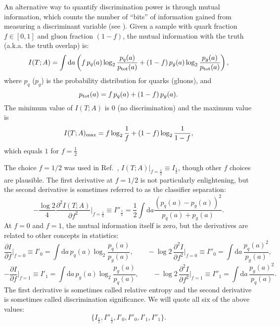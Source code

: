 \documentclass[11pt,letterpaper]{article}
\newcommand{\df}{\text{d}}
\DeclareRobustCommand{\Ref}[1]{Ref.~\cite{#1}}
\newcommand{\be}{\begin{equation}}
\newcommand{\ee}{\end{equation}}
\begin{document}
An alternative way to quantify discrimination power is through mutual information, which counts the number of ``bits'' of information gained from measuring a discriminant variable (see \cite{Larkoski:2014pca}).  Given a sample with quark fraction $f \in [0,1]$ and gluon fraction $(1-f)$, the mutual information with the truth (a.k.a. the truth overlap) is:
\be
I(T;A) = \int \df a \left(f \, p_q(a) \log_2 \frac{p_q(a)}{p_{\rm tot}(a)} + (1-f) \, p_g(a) \log_2 \frac{p_g(a)}{p_{\rm tot}(a)}   \right),
\ee
where $p_q$ ($p_g$) is the probability distribution for quarks (gluons), and
\be
p_{\rm tot}(a) = f \, p_q(a) + (1-f) \, p_g(a).
\ee
The minimum value of $I(T;A)$ is $0$ (no discrimination) and the maximum value is
\be
I(T;A)_{\rm max} = f \log_2 \frac{1}{f} + (1-f) \log_2 \frac{1}{1-f},
\ee
which equals $1$ for $f = \frac{1}{2}$

The choice $f = 1/2$ was used in \Ref{Larkoski:2014pca}, $I(T;A)\big|_{f = \frac{1}{2}} \equiv I_{\frac{1}{2}}$, though other $f$ choices are plausible.  The first derivative at $f = 1/2$ is not particularly enlightening, but the second derivative is sometimes referred to as the classifier separation:
\be
- \frac{\log 2}{4} \frac{\partial^2 I(T;A)}{\partial f^2} \Big|_{f = \frac{1}{2}} \equiv I''_\frac{1}{2} = \frac{1}{2} \int \df a \frac{\left(p_q(a) - p_g(a)\right)^2}{p_q(a) + p_g(a)}.
\ee
At $f = 0$ and $f = 1$, the mutual information itself is zero, but the derivatives are related to other concepts in statistics:
\be
\frac{\partial I}{\partial f} \Big|_{f = 0} \equiv I'_0 = \int \df a \, p_q(a)  \log_2 \frac{p_q(a)}{p_g(a)}, \qquad - \log 2 \,  \frac{\partial^2 I}{\partial f^2} \Big|_{f = 0} \equiv I''_0 = \int \df a \,  \frac{p_q(a)^2}{p_g(a)},
\ee
\be
- \frac{\partial I}{\partial f} \Big|_{f = 1} \equiv I'_1 = \int \df a \, p_g(a) \log_2 \frac{p_g(a)}{p_q(a)}, \qquad - \log 2 \, \frac{\partial^2 I}{\partial f^2} \Big|_{f = 1} \equiv I''_1 = \int \df a \, \frac{p_g(a)^2}{p_q(a)}.
\ee
The first derivative is sometimes called relative entropy and the second derivative is sometimes called discrimination significance.  We will quote all six of the above values:
\be
\{I_\frac{1}{2}, I''_{\frac{1}{2}}, I'_0, I''_0, I'_1, I''_1 \}.
\ee











\end{document}
